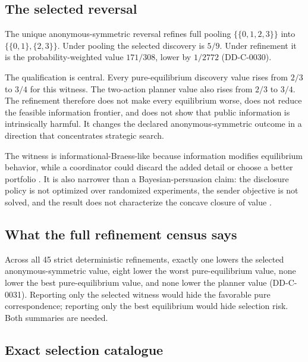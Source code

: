 \documentclass[11pt]{article}
\theoremstyle{remark}
\begin{document}
\subsection{The selected reversal}

The unique anonymous-symmetric reversal refines full pooling
$\{\{0,1,2,3\}\}$ into $\{\{0,1\},\{2,3\}\}$. Under pooling the selected discovery
is $5/9$. Under refinement it is the probability-weighted value $171/308$, lower
by $1/2772$ (DD-C-0030).



The qualification is central. Every pure-equilibrium discovery value rises from
$2/3$ to $3/4$ for this witness. The two-action planner value also rises from
$2/3$ to $3/4$. The refinement therefore does not make every equilibrium worse,
does not reduce the feasible information frontier, and does not show that public
information is intrinsically harmful. It changes the declared anonymous-symmetric
outcome in a direction that concentrates strategic search.

The witness is informational-Braess-like because information modifies equilibrium
behavior, while a coordinator could discard the added detail or choose a better
portfolio \citep{AcemogluEtAl2018}. It is also narrower than a Bayesian-persuasion
claim: the disclosure policy is not optimized over randomized experiments, the
sender objective is not solved, and the result does not characterize the concave
closure of value \citep{KamenicaGentzkow2011}.

\subsection{What the full refinement census says}

Across all 45 strict deterministic refinements, exactly one lowers the selected
anonymous-symmetric value, eight lower the worst pure-equilibrium value, none
lower the best pure-equilibrium value, and none lower the planner value
(DD-C-0031). Reporting only the selected witness would hide the favorable pure
correspondence; reporting only the best equilibrium would hide selection risk.
Both summaries are needed.

\subsection{Exact selection catalogue}
\end{document}
